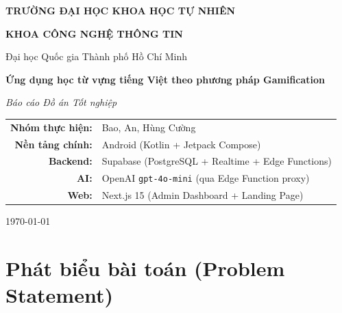 \documentclass[12pt,a4paper]{article}
\begin{document}
\begin{titlepage}
\centering
\vspace*{1cm}

{\large \textbf{TRƯỜNG ĐẠI HỌC KHOA HỌC TỰ NHIÊN}\par}
{\large \textbf{KHOA CÔNG NGHỆ THÔNG TIN}\par}
\vspace{0.2cm}
{\normalsize Đại học Quốc gia Thành phố Hồ Chí Minh\par}

\vspace{2cm}


\vspace{0.6cm}
{\Large \textbf{Ứng dụng học từ vựng tiếng Việt theo phương pháp Gamification}\par}

\vspace{0.4cm}
{\large\itshape Báo cáo Đồ án Tốt nghiệp\par}

\vspace{2cm}

\begin{tabular}{rl}
\textbf{Nhóm thực hiện:} & Bao, An, Hùng Cường \\[4pt]
\textbf{Nền tảng chính:} & Android (Kotlin + Jetpack Compose) \\[4pt]
\textbf{Backend:}        & Supabase (PostgreSQL + Realtime + Edge Functions) \\[4pt]
\textbf{AI:}             & OpenAI \texttt{gpt-4o-mini} (qua Edge Function proxy) \\[4pt]
\textbf{Web:}            & Next.js 15 (Admin Dashboard + Landing Page) \\
\end{tabular}

\vfill
{\large \today\par}

\end{titlepage}

\tableofcontents
\listoffigures
\newpage

\section{Phát biểu bài toán (Problem Statement)}
\label{sec:problem}
\end{document}
